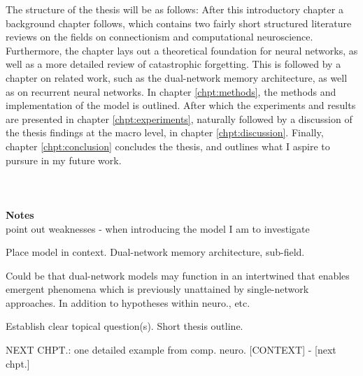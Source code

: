 The structure of the thesis will be as follows: After this introductory chapter a background chapter follows, which contains two fairly short structured literature reviews on the fields on connectionism and computational neuroscience. Furthermore, the chapter lays out a theoretical foundation for neural networks, as well as a more detailed review of catastrophic forgetting. This is followed by a chapter on related work, such as the dual-network memory architecture, as well as on recurrent neural networks. In chapter \ref{chpt:methods}, the methods and implementation of the model is outlined. After which the experiments and results are presented in chapter \ref{chpt:experiments}, naturally followed by a discussion of the thesis findings at the macro level, in chapter \ref{chpt:discussion}. Finally, chapter \ref{chpt:conclusion} concludes the thesis, and outlines what I aspire to pursure in my future work.
\\\\\\\\


\textbf{Notes}
\\

point out weaknesses - when introducing the model I am to investigate

Place model in context.
Dual-network memory architecture, sub-field.

Could be that dual-network models may function in an intertwined that enables emergent phenomena which is previously unattained by single-network approaches. In addition to hypotheses within neuro., etc.

Establish clear topical question(s).
Short thesis outline.


NEXT CHPT.:
one detailed example from comp. neuro. [CONTEXT] - [next chpt.]

\cleardoublepage